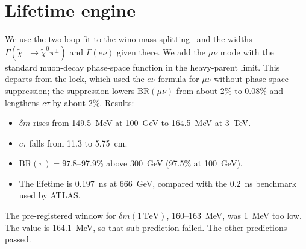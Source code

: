 \documentclass[aps,prd,twocolumn,superscriptaddress,nofootinbib,showkeys]{revtex4-2}
\begin{document}
\section{Lifetime engine}
We use the two-loop fit to the wino mass splitting~\cite{IMS} and the widths $\Gamma(\tilde\chi^\pm\to\tilde\chi^0\pi^\pm)$ and $\Gamma(e\nu)$ given there. We add the $\mu\nu$ mode with the standard muon-decay phase-space function in the heavy-parent limit. This departs from the lock, which used the $e\nu$ formula for $\mu\nu$ without phase-space suppression; the suppression lowers BR$(\mu\nu)$ from about 2\% to 0.08\% and lengthens $c\tau$ by about 2\%. Results:
\begin{itemize}
\item $\delta m$ rises from 149.5~MeV at 100~GeV to 164.5~MeV at 3~TeV.
\item $c\tau$ falls from 11.3 to 5.75~cm.
\item BR$(\pi)=97.8$--97.9\% above 300~GeV (97.5\% at 100~GeV).
\item The lifetime is 0.197~ns at 666~GeV, compared with the 0.2~ns benchmark used by ATLAS.
\end{itemize}
The pre-registered window for $\delta m(1\,\mathrm{TeV})$, 160--163~MeV, was 1~MeV too low. The value is 164.1~MeV, so that sub-prediction failed. The other predictions passed.
\end{document}
